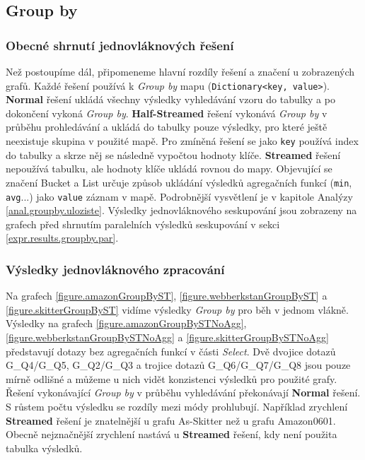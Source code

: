\subsection{Group by}

\subsubsection{Obecné shrnutí jednovláknových řešení}

Než postoupíme dál, připomeneme hlavní rozdíly řešení a značení u zobrazených grafů. 
Každé řešení používá k \textit{Group by} mapu (\verb+Dictionary<key, value>+).
\textbf{Normal} řešení ukládá všechny výsledky vyhledávání vzoru do tabulky a po dokončení vykoná \textit{Group by}. 
\textbf{Half-Streamed} řešení vykonává \textit{Group by} v průběhu prohledávání a ukládá do tabulky pouze výsledky, pro které ještě neexistuje skupina v použité mapě.
Pro zmíněná řešení se jako \verb+key+ používá index do tabulky a skrze něj se následně vypočtou hodnoty klíče.
\textbf{Streamed} řešení nepoužívá tabulku, ale hodnoty klíče ukládá rovnou do mapy. 
Objevující se značení Bucket a List určuje způsob ukládání výsledků agregačních funkcí (\verb+min+, \verb+avg+...) jako \verb+value+ záznam v mapě.
Podrobnější vysvětlení je v kapitole Analýzy \ref{anal.groupby.uloziste}.
Výsledky jednovláknového seskupování jsou zobrazeny na grafech před shrnutím paralelních výsledků seskupování v sekci \ref{expr.results.groupby.par}.

\subsubsection{Výsledky jednovláknového zpracování}

Na grafech \ref{figure.amazonGroupByST}, \ref{figure.webberkstanGroupByST} a \ref{figure.skitterGroupByST} vidíme výsledky \textit{Group by} pro běh v jednom vlákně.
Výsledky na grafech \ref{figure.amazonGroupBySTNoAgg}, \ref{figure.webberkstanGroupBySTNoAgg} a \ref{figure.skitterGroupBySTNoAgg} představují dotazy bez agregačních funkcí v části \textit{Select}.
Dvě dvojice dotazů G\_Q4/G\_Q5, G\_Q2/G\_Q3 a trojice dotazů G\_Q6/G\_Q7/G\_Q8 jsou pouze mírně odlišné a můžeme u nich vidět konzistenci výsledků pro použité grafy.
Řešení vykonávající \textit{Group by} v průběhu vyhledávání překonávají \textbf{Normal} řešení.
S růstem počtu výsledku se rozdíly mezi módy prohlubují. 
Například zrychlení \textbf{Streamed} řešení je znatelnější u grafu As-Skitter než u grafu Amazon0601. 
Obecně nejznačnější zrychlení nastává u \textbf{Streamed} řešení, kdy není použita tabulka výsledků.

